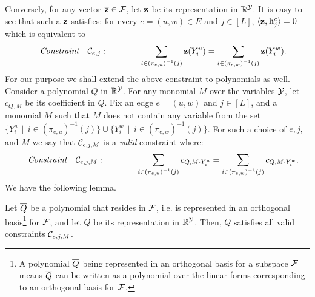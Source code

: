 Conversely, for any vector $\ol{\bf z} \in \mc{F}$, let ${\bf z}$ be its representation in $\mathbb{R}^{\mathcal{Y}}$. It is easy to see that such a ${\bf z}$ satisfies: for every $e=(u,w) \in E$ and  $j \in [L]$, $\langle {\bf z}, {\bf h}^{e}_j \rangle = 0$ which is equivalent to
\begin{equation}					\label{eq:folding_constraint}
\tn{\it Constraint }\ \ {\mc{C}_{e,j}:} \qquad\qquad \sum_{i \in \left(\pi_{e,u}\right)^{-1}(j)} {\bf z}(Y^u_i)  = \sum_{i \in \left(\pi_{e,w}\right)^{-1}(j)} {\bf z}(Y^w_i). 
\end{equation}
For our purpose we shall extend the above constraint to polynomials as well. Consider a polynomial $Q$ in $\mathbb{R}^{\mathcal{Y}}$. For any monomial $M$ over the variables $\mathcal{Y}$, let $c_{Q,M}$ be its coefficient in $Q$. Fix an edge $e = (u,w)$ and $j \in [L]$, and a monomial $M$ such that $M$ does not contain any variable from the set $\{Y^u_i\, \mid\, i\in \left(\pi_{e,u}\right)^{-1}(j)\}\cup \{Y^w_i\, \mid\, i\in \left(\pi_{e,w}\right)^{-1}(j)\}$. For such a choice of $e, j,$ and $M$ we say that $\mathcal{C}_{e,j,M}$ is a \emph{valid} constraint where:
\begin{equation}					\label{eq:folding_constraint_poly}
\tn{\it Constraint }\ \ {\mc{C}_{e,j,M}:} \qquad\qquad \sum_{i \in \left(\pi_{e,u}\right)^{-1}(j)} c_{Q,M\cdot Y^u_i}  = \sum_{i \in \left(\pi_{e,w}\right)^{-1}(j)} c_{Q,M\cdot Y^w_i}. 
\end{equation}
We have the following lemma.
\begin{lemma}\label{lem-folding-poly}
Let $\overline{Q}$ be a polynomial that resides in $\mathcal{F}$, i.e. is represented in an orthogonal basis\footnote{A polynomial $\overline{Q}$ being represented in an orthogonal basis for a subspace $\mathcal{F}$ means $\overline{Q}$ can be written as a polynomial over the linear forms corresponding to an orthogonal basis for $\mathcal{F}$.} for $\mathcal{F}$, and let $Q$ be its representation in $\mathbb{R}^{\mathcal{Y}}$. Then, $Q$ satisfies all valid constraints $\mathcal{C}_{e,j,M}$.
\end{lemma}
